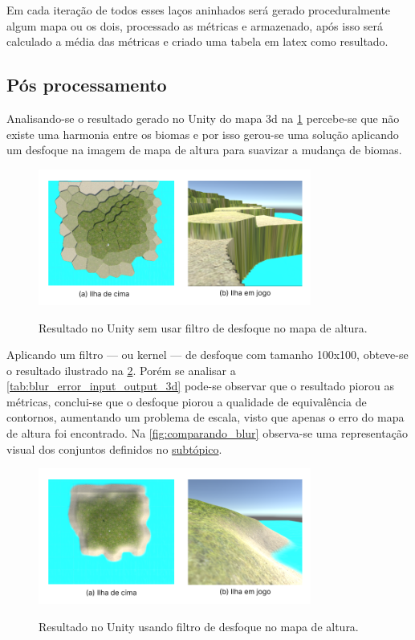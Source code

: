 Em cada iteração de todos esses laços aninhados será gerado proceduralmente algum mapa ou os dois, processado as métricas e armazenado, após isso será calculado a média das métricas e criado uma tabela em latex como resultado.

\subsection{Pós processamento}
Analisando-se o resultado gerado no Unity do mapa 3d na \cref{fig:Unity_init} percebe-se que não existe uma harmonia entre os biomas e por isso gerou-se uma solução aplicando um desfoque na imagem de mapa de altura para suavizar a mudança de biomas.

\begin{figure}[!ht]
	\centering
    \caption{Resultado no Unity sem usar filtro de desfoque no mapa de altura.}
	\includegraphics[width=0.8\textwidth]{figures/Unity_entry.png}
	\label{fig:Unity_init}
\end{figure}

Aplicando um filtro — ou kernel — de desfoque com tamanho 100x100, obteve-se o resultado ilustrado na \cref{fig:Unity_blur}. Porém se analisar a \cref{tab:blur_error_input_output_3d} pode-se observar que o resultado piorou as métricas, conclui-se que o desfoque piorou a qualidade de equivalência de contornos, aumentando um problema de escala, visto que apenas o erro do mapa de altura foi encontrado. Na \cref{fig:comparando_blur} observa-se uma representação visual dos conjuntos definidos no \hyperref[sec:classificacao_conjuntos]{subtópico}.

\begin{figure}[!ht]
	\centering
    \caption{Resultado no Unity usando filtro de desfoque no mapa de altura.}
	\includegraphics[width=0.8\textwidth]{figures/Unity_blur.png}
	\label{fig:Unity_blur}
\end{figure}

